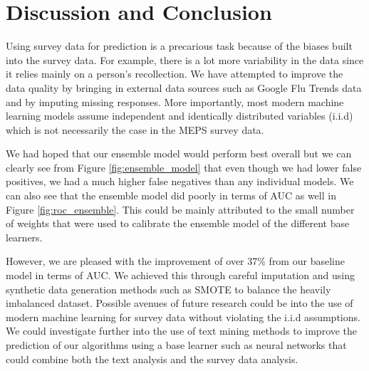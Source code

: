 \documentclass[twoside,11pt]{article}
\begin{document}
\section{Discussion and Conclusion}
Using survey data for prediction is a precarious task because of the biases
built into the survey data. For example, there is a lot more variability in the
data since it relies mainly on a person's recollection. We have attempted to
improve the data quality by bringing in external data sources such as Google Flu
Trends data and by imputing missing responses. More importantly, most modern
machine learning models assume independent and identically distributed variables
(i.i.d) which is not necessarily the case in the MEPS survey data.

We had hoped that our ensemble model would perform best overall but we can
clearly see from Figure \ref{fig:ensemble_model} that even though we had lower false
positives, we had a much higher false negatives than any individual models. We
can also see that the ensemble model did poorly in terms of AUC as well in
Figure \ref{fig:roc_ensemble}. This could be mainly attributed to the small
number of weights that were used to calibrate the ensemble model of the
different base learners. \citep{ensemblingModels}

However, we are pleased with the improvement of over 37\% from our baseline
model in terms of AUC. We achieved this through careful imputation and using
synthetic data generation methods such as SMOTE to balance the heavily
imbalanced dataset. Possible avenues of future research could be into the use of
modern machine learning for survey data without violating the i.i.d assumptions.
We could investigate further into the use of text mining methods to improve the
prediction of our algorithms using a base learner such as neural networks that
could combine both the text analysis and the survey data analysis.


\end{document}
